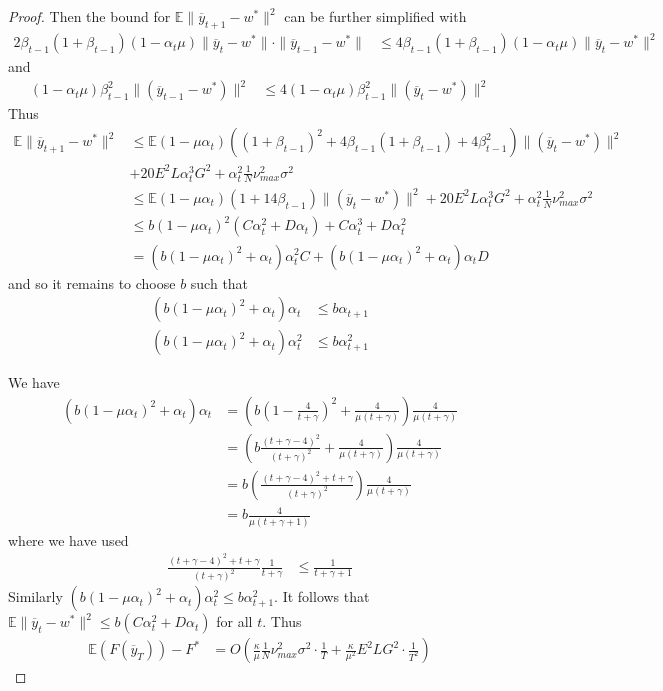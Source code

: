 \begin{proof}
	Then the bound for $\mathbb{E}\|\overline{y}_{t+1}-w^{\ast}\|^{2}$
	can be further simplified with 
	\begin{align*}
	2\beta_{t-1}(1+\beta_{t-1})(1-\alpha_{t}\mu)\|\overline{y}_{t}-w^{\ast}\|\cdot\|\overline{y}_{t-1}-w^{\ast}\| & \leq4\beta_{t-1}(1+\beta_{t-1})(1-\alpha_{t}\mu)\|\overline{y}_{t}-w^{\ast}\|^{2}
	\end{align*}
	and 
	\begin{align*}
	(1-\alpha_{t}\mu)\beta_{t-1}^{2}\|(\overline{y}_{t-1}-w^{\ast})\|^{2} & \leq4(1-\alpha_{t}\mu)\beta_{t-1}^{2}\|(\overline{y}_{t}-w^{\ast})\|^{2}
	\end{align*}
	Thus 
	\begin{align*}
	\mathbb{E}\|\overline{y}_{t+1}-w^{\ast}\|^{2} & \leq\mathbb{E}(1-\mu\alpha_{t})((1+\beta_{t-1})^{2}+4\beta_{t-1}(1+\beta_{t-1})+4\beta_{t-1}^{2})\|(\overline{y}_{t}-w^{\ast})\|^{2}\\
	& +20E^{2}L\alpha_{t}^{3}G^{2}+\alpha_{t}^{2}\frac{1}{N}\nu_{max}^{2}\sigma^{2}\\
	& \leq\mathbb{E}(1-\mu\alpha_{t})(1+14\beta_{t-1})\|(\overline{y}_{t}-w^{\ast})\|^{2}+20E^{2}L\alpha_{t}^{3}G^{2}+\alpha_{t}^{2}\frac{1}{N}\nu_{max}^{2}\sigma^{2}\\
	& \leq b(1-\mu\alpha_{t})^{2}(C\alpha_{t}^{2}+D\alpha_{t})+C\alpha_{t}^{3}+D\alpha_{t}^{2}\\
	& =(b(1-\mu\alpha_{t})^{2}+\alpha_{t})\alpha_{t}^{2}C+(b(1-\mu\alpha_{t})^{2}+\alpha_{t})\alpha_{t}D
	\end{align*}
	and so it remains to choose $b$ such that 
	\begin{align*}
	(b(1-\mu\alpha_{t})^{2}+\alpha_{t})\alpha_{t} & \leq b\alpha_{t+1}\\
	(b(1-\mu\alpha_{t})^{2}+\alpha_{t})\alpha_{t}^{2} & \leq b\alpha_{t+1}^{2}
	\end{align*}
	
	We have 
	\begin{align*}
	(b(1-\mu\alpha_{t})^{2}+\alpha_{t})\alpha_{t} & =(b(1-\frac{4}{t+\gamma})^{2}+\frac{4}{\mu(t+\gamma)})\frac{4}{\mu(t+\gamma)}\\
	& =(b\frac{(t+\gamma-4)^{2}}{(t+\gamma)^{2}}+\frac{4}{\mu(t+\gamma)})\frac{4}{\mu(t+\gamma)}\\
	& =b(\frac{(t+\gamma-4)^{2}+t+\gamma}{(t+\gamma)^{2}})\frac{4}{\mu(t+\gamma)}\\
	& =b\frac{4}{\mu(t+\gamma+1)}
	\end{align*}
	where we have used 
	\begin{align*}
	\frac{(t+\gamma-4)^{2}+t+\gamma}{(t+\gamma)^{2}}\frac{1}{t+\gamma} & \leq\frac{1}{t+\gamma+1}
	\end{align*}
	Similarly $(b(1-\mu\alpha_{t})^{2}+\alpha_{t})\alpha_{t}^{2}\leq b\alpha_{t+1}^{2}$.
	It follows that $\mathbb{E}\|\overline{y}_{t}-w^{\ast}\|^{2}\leq b(C\alpha_{t}^{2}+D\alpha_{t})$
	for all $t$. Thus 
	\begin{align*}
	\mathbb{E}(F(\overline{y}_{T}))-F^{\ast} & =O(\frac{\kappa}{\mu}\frac{1}{N}\nu_{max}^{2}\sigma^{2}\cdot\frac{1}{T}+\frac{\kappa}{\mu^{2}}E^{2}LG^{2}\cdot\frac{1}{T^{2}})
	\end{align*}
	

\end{proof}
